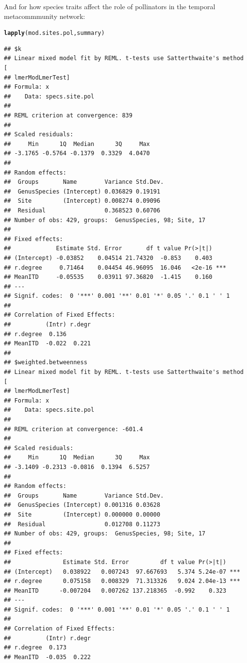 \documentclass{article}\usepackage[]{graphicx}\usepackage[]{color}
\makeatletter
\newcommand{\hlstd}[1]{\textcolor[rgb]{0.345,0.345,0.345}{#1}}%
\newcommand{\hlkwd}[1]{\textcolor[rgb]{0.737,0.353,0.396}{\textbf{#1}}}%
\newenvironment{kframe}{%
 \def\at@end@of@kframe{}%
 \ifinner\ifhmode%
  \def\at@end@of@kframe{\end{minipage}}%
  \begin{minipage}{\columnwidth}%
 \fi\fi%
 \def\FrameCommand##1{\hskip\@totalleftmargin \hskip-\fboxsep
 \colorbox{shadecolor}{##1}\hskip-\fboxsep
     \hskip-\linewidth \hskip-\@totalleftmargin \hskip\columnwidth}%
 \MakeFramed {\advance\hsize-\width
   \@totalleftmargin\z@ \linewidth\hsize
   \@setminipage}}%
 {\par\unskip\endMakeFramed%
 \at@end@of@kframe}
\newenvironment{knitrout}{}{} %
\makeatother
\begin{document}
And for how species traits affect the role of pollinators in
the temporal metacommmunity network: 
\begin{knitrout}
\color{fgcolor}\begin{kframe}
\begin{alltt}
\hlkwd{lapply}\hlstd{(mod.sites.pol, summary)}
\end{alltt}
\begin{verbatim}
## $k
## Linear mixed model fit by REML. t-tests use Satterthwaite's method [
## lmerModLmerTest]
## Formula: x
##    Data: specs.site.pol
## 
## REML criterion at convergence: 839
## 
## Scaled residuals: 
##     Min      1Q  Median      3Q     Max 
## -3.1765 -0.5764 -0.1379  0.3329  4.0470 
## 
## Random effects:
##  Groups       Name        Variance Std.Dev.
##  GenusSpecies (Intercept) 0.036829 0.19191 
##  Site         (Intercept) 0.008274 0.09096 
##  Residual                 0.368523 0.60706 
## Number of obs: 429, groups:  GenusSpecies, 98; Site, 17
## 
## Fixed effects:
##             Estimate Std. Error       df t value Pr(>|t|)    
## (Intercept) -0.03852    0.04514 21.74320  -0.853    0.403    
## r.degree     0.71464    0.04454 46.96095  16.046   <2e-16 ***
## MeanITD     -0.05535    0.03911 97.36820  -1.415    0.160    
## ---
## Signif. codes:  0 '***' 0.001 '**' 0.01 '*' 0.05 '.' 0.1 ' ' 1
## 
## Correlation of Fixed Effects:
##          (Intr) r.degr
## r.degree  0.136       
## MeanITD  -0.022  0.221
## 
## $weighted.betweenness
## Linear mixed model fit by REML. t-tests use Satterthwaite's method [
## lmerModLmerTest]
## Formula: x
##    Data: specs.site.pol
## 
## REML criterion at convergence: -601.4
## 
## Scaled residuals: 
##     Min      1Q  Median      3Q     Max 
## -3.1409 -0.2313 -0.0816  0.1394  6.5257 
## 
## Random effects:
##  Groups       Name        Variance Std.Dev.
##  GenusSpecies (Intercept) 0.001316 0.03628 
##  Site         (Intercept) 0.000000 0.00000 
##  Residual                 0.012708 0.11273 
## Number of obs: 429, groups:  GenusSpecies, 98; Site, 17
## 
## Fixed effects:
##               Estimate Std. Error         df t value Pr(>|t|)    
## (Intercept)   0.038922   0.007243  97.667693   5.374 5.24e-07 ***
## r.degree      0.075158   0.008329  71.313326   9.024 2.04e-13 ***
## MeanITD      -0.007204   0.007262 137.218365  -0.992    0.323    
## ---
## Signif. codes:  0 '***' 0.001 '**' 0.01 '*' 0.05 '.' 0.1 ' ' 1
## 
## Correlation of Fixed Effects:
##          (Intr) r.degr
## r.degree  0.173       
## MeanITD  -0.035  0.222
\end{verbatim}
\end{kframe}
\end{knitrout}
\end{document}
